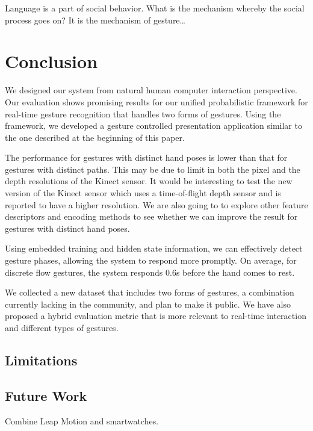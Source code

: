\begin{savequote}
Language is a part of social behavior. What is the mechanism whereby the social
process goes on? It is the mechanism of gesture\ldots
{}
\end{savequote}
\chapter{Conclusion}
We designed our system from natural human computer interaction perspective.
Our evaluation shows promising results for our unified probabilistic framework
for real-time gesture recognition that handles two forms of gestures. Using the
framework, we developed a gesture controlled presentation application similar to
the one described at the beginning of this paper.

The performance for gestures with distinct hand poses is lower than that for
gestures with distinct paths. This may be due to limit in
both the pixel and the depth resolutions of the Kinect sensor. It would be interesting to test
the new version of the Kinect sensor which uses a time-of-flight depth sensor
and is reported to have a higher resolution. We are also going to to explore
other feature descriptors and encoding methods to see whether we can
improve the result for gestures with distinct hand poses.

Using embedded training and hidden state information, we can effectively
detect gesture phases, allowing the system to respond more promptly. On average,
for discrete flow gestures, the system responds 0.6s before the hand comes to
rest. 

We collected a new dataset that includes two forms of gestures, a
combination currently lacking in the community, and plan to make it
public. We have also proposed a hybrid evaluation metric
that is more relevant to real-time interaction and different types of gestures.

\section{Limitations}
\section{Future Work}
Combine Leap Motion and smartwatches.